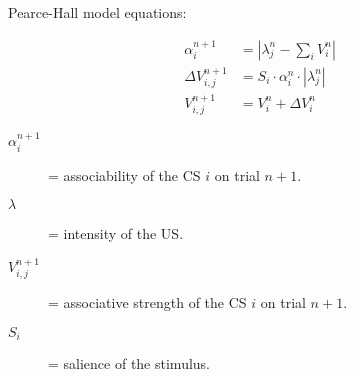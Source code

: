 \documentclass[border=10pt,varwidth]{standalone}
\begin{document}
Pearce-Hall model equations:


\begin{align}
\alpha_i^{n+1} &= \left| \lambda_j^{n} - \sum_i V^n_i \right| \label{pearce_hall_alpha} \\
\Delta V^{n+1}_{i,j} &= S_i \cdot \alpha^n_i \cdot \left| \lambda_j^n \right| \label{pearce_hall_deltav} \\
V^{n+1}_{i,j} &= V^n_i + \Delta V_i^n \label{pearce_hall}
\end{align}


\begin{description}
	\item[$\alpha_i^{n + 1}$] = associability of the CS $i$ on trial $n + 1$.
	\item[$\lambda$] = intensity of the US.
	\item[$V_{i,j}^{n + 1}$] = associative strength of the CS $i$ on trial $n + 1$.
	\item[$S_i$] = salience of the stimulus.
\end{description} \vspace{10pt}
\end{document}
